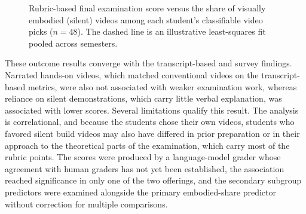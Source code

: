 \documentclass[fleqn,10pt]{JLA_article} %
\begin{document}
\begin{figure}[h!]
    \centering
    \caption{Rubric-based final examination score versus the share of visually embodied (silent) videos among each student's classifiable video picks ($n = 48$). The dashed line is an illustrative least-squares fit pooled across semesters.}
    \label{fig:exam_scatter}
\end{figure}

These outcome results converge with the transcript-based and survey findings. Narrated hands-on videos, which matched conventional videos on the transcript-based metrics, were also not associated with weaker examination work, whereas reliance on silent demonstrations, which carry little verbal explanation, was associated with lower scores. Several limitations qualify this result. The analysis is correlational, and because the students chose their own videos, students who favored silent build videos may also have differed in prior preparation or in their approach to the theoretical parts of the examination, which carry most of the rubric points. The scores were produced by a language-model grader whose agreement with human graders has not yet been established, the association reached significance in only one of the two offerings, and the secondary subgroup predictors were examined alongside the primary embodied-share predictor without correction for multiple comparisons.
\end{document}
